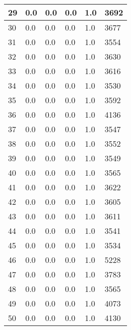 \begin{longtable}{|l|l|l|l|l|l|}
29 & 0.0 & 0.0 & 0.0 & 1.0 & 3692 \\ \hline 
30 & 0.0 & 0.0 & 0.0 & 1.0 & 3677 \\ \hline 
31 & 0.0 & 0.0 & 0.0 & 1.0 & 3554 \\ \hline 
32 & 0.0 & 0.0 & 0.0 & 1.0 & 3630 \\ \hline 
33 & 0.0 & 0.0 & 0.0 & 1.0 & 3616 \\ \hline 
34 & 0.0 & 0.0 & 0.0 & 1.0 & 3530 \\ \hline 
35 & 0.0 & 0.0 & 0.0 & 1.0 & 3592 \\ \hline 
36 & 0.0 & 0.0 & 0.0 & 1.0 & 4136 \\ \hline 
37 & 0.0 & 0.0 & 0.0 & 1.0 & 3547 \\ \hline 
38 & 0.0 & 0.0 & 0.0 & 1.0 & 3552 \\ \hline 
39 & 0.0 & 0.0 & 0.0 & 1.0 & 3549 \\ \hline 
40 & 0.0 & 0.0 & 0.0 & 1.0 & 3565 \\ \hline 
41 & 0.0 & 0.0 & 0.0 & 1.0 & 3622 \\ \hline 
42 & 0.0 & 0.0 & 0.0 & 1.0 & 3605 \\ \hline 
43 & 0.0 & 0.0 & 0.0 & 1.0 & 3611 \\ \hline 
44 & 0.0 & 0.0 & 0.0 & 1.0 & 3541 \\ \hline 
45 & 0.0 & 0.0 & 0.0 & 1.0 & 3534 \\ \hline 
46 & 0.0 & 0.0 & 0.0 & 1.0 & 5228 \\ \hline 
47 & 0.0 & 0.0 & 0.0 & 1.0 & 3783 \\ \hline 
48 & 0.0 & 0.0 & 0.0 & 1.0 & 3565 \\ \hline 
49 & 0.0 & 0.0 & 0.0 & 1.0 & 4073 \\ \hline 
50 & 0.0 & 0.0 & 0.0 & 1.0 & 4130 \\ \hline 
\end{longtable}